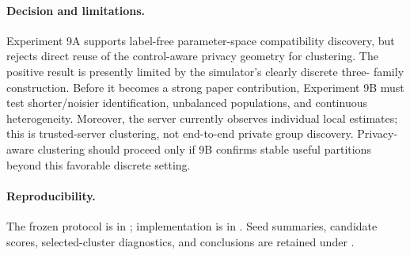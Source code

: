 \paragraph{Decision and limitations.}
Experiment 9A supports label-free parameter-space compatibility discovery, but
rejects direct reuse of the control-aware privacy geometry for clustering. The
positive result is presently limited by the simulator's clearly discrete three-
family construction. Before it becomes a strong paper contribution, Experiment
9B must test shorter/noisier identification, unbalanced populations, and
continuous heterogeneity. Moreover, the server currently observes individual
local estimates; this is trusted-server clustering, not end-to-end private
group discovery. Privacy-aware clustering should proceed only if 9B confirms
stable useful partitions beyond this favorable discrete setting.

\paragraph{Reproducibility.}
The frozen protocol is in ; implementation
is in . Seed summaries,
candidate scores, selected-cluster diagnostics, and conclusions are retained
under .
